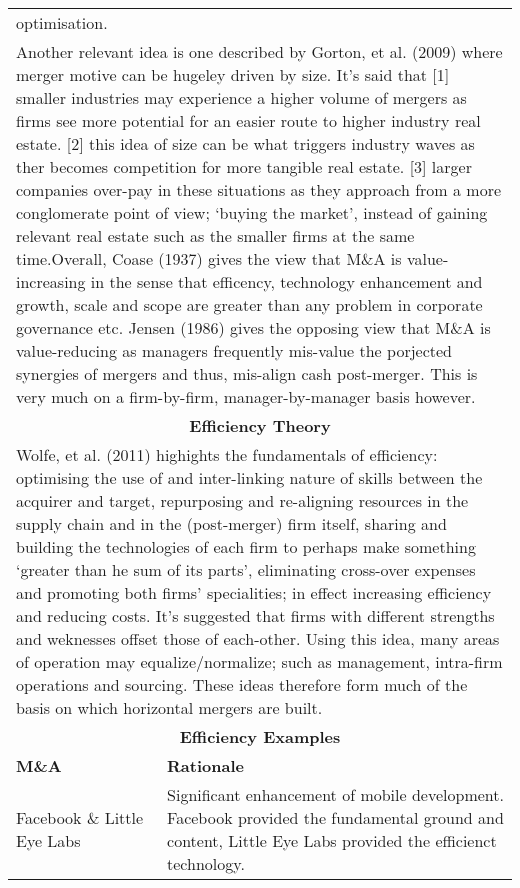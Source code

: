\documentclass[11pt, english]{article}
\begin{document}
\begin{center}
\begin{longtable}{p{5cm}p{7.5cm}}
optimisation.\newline}\\
	\multicolumn{2}{p{13cm}}{Another relevant idea is one described by Gorton, et al. (2009) where merger motive can be hugeley driven by size. It's said that [1] smaller industries may experience a higher volume of mergers as firms see more potential for an easier route to higher industry real estate. [2] this idea of size can be what triggers industry waves as ther becomes competition for more tangible real estate. [3] larger companies over-pay in these situations as they approach from a more conglomerate point of view; `buying the market', instead of gaining relevant real estate such as the smaller firms at the same time.\newline\newline Overall, Coase (1937) gives the view that M\&A is value-increasing in the sense that efficency, technology enhancement and growth, scale and scope are greater than any problem in corporate governance etc. Jensen (1986) gives the opposing view that M\&A is value-reducing as managers frequently mis-value the porjected synergies of mergers and thus, mis-align cash post-merger. This is very much on a firm-by-firm, manager-by-manager basis however.}\\
        \hline
        \hline
        \multicolumn{2}{c}{\textbf{Efficiency Theory}}\\
        \hline
        \hline
        \multicolumn{2}{p{13cm}}{Wolfe, et al. (2011) highights the fundamentals of efficiency: optimising the use of and inter-linking nature of skills between the acquirer and target, repurposing and re-aligning resources in the supply chain and in the (post-merger) firm itself, sharing and building the technologies of each firm to perhaps make something `greater than he sum of its parts', eliminating cross-over expenses and promoting both firms' specialities; in effect increasing efficiency and reducing costs. It's suggested that firms with different strengths and weknesses offset those of each-other. Using this idea, many areas of operation may equalize/normalize; such as management, intra-firm operations and sourcing. These ideas therefore form much of the basis on which horizontal mergers are built.}\\
        \hline
        \multicolumn{2}{c}{\textbf{Efficiency Examples}}\\
        \hline
        \textbf{M\&A} & \textbf{Rationale}\\
        \hline
        Facebook \& Little Eye Labs & Significant enhancement of mobile development. Facebook provided the fundamental ground and content, Little Eye Labs provided the efficienct technology.\\

\end{longtable}
\end{center}
\end{document}
